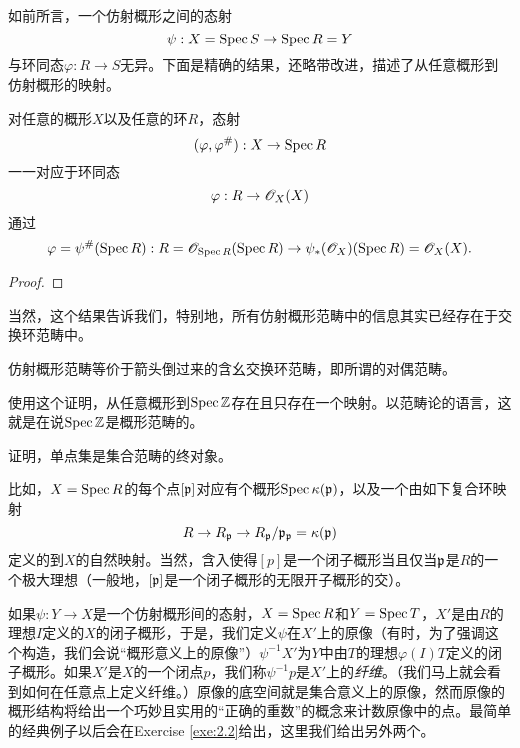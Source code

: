 如前所言，一个仿射概形之间的态射
\[
	\psi:X=\operatorname{Spec} S\to\operatorname{Spec} R=Y
\]
与环同态$\varphi:R\to S$无异。下面是精确的结果，还略带改进，描述了从任意概形到仿射概形的映射。

\begin{thm}
对任意的概形$X$以及任意的环$R$，态射
\[
	(\varphi,\varphi^\#):X\to \operatorname{Spec} R
\]
一一对应于环同态
\[
	\varphi:R\to \mathscr{O}_X(X)
\]
通过
\[
	\varphi=\psi^\#(\operatorname{Spec} R):R=\mathscr{O}_{\operatorname{Spec} R}(\operatorname{Spec} R)\to \psi_*(\mathscr{O}_X)(\operatorname{Spec} R)=\mathscr{O}_X(X).
\]
\end{thm}

\begin{proof}
\nottran
\end{proof}

当然，这个结果告诉我们，特别地，所有仿射概形范畴中的信息其实已经存在于交换环范畴中。

\begin{coro}\label{coro:1.41}
	仿射概形范畴等价于箭头倒过来的含幺交换环范畴，即所谓的对偶范畴。
\end{coro}

\begin{exe}\label{exe:1.42}
	\begin{compactenum}[(a)]
	\item 使用这个证明，从任意概形到$\operatorname{Spec} \mathbb{Z}$存在且只存在一个映射。以范畴论的语言，这就是在说$\operatorname{Spec} \mathbb{Z}$是概形范畴的。
	\item 证明，单点集是集合范畴的终对象。
	\end{compactenum}
\end{exe}

比如，$X=\operatorname{Spec} R$的每个点$[\mathfrak{p}]$对应有个概形$\operatorname{Spec} \kappa(\mathfrak{p})$，以及一个由如下复合环映射
\[
	R\to R_{\mathfrak{p}}\to R_{\mathfrak{p}}/\mathfrak{p}_{\mathfrak{p}}=\kappa(\mathfrak{p})
\]
定义的到$X$的自然映射。当然，含入使得$[p]$是一个闭子概形当且仅当$\mathfrak{p}$是$R$的一个极大理想（一般地，$[\mathfrak{p}]$是一个闭子概形的无限开子概形的交）。

如果$\psi:Y\to X$是一个仿射概形间的态射，$X=\operatorname{Spec} R$和$Y=\operatorname{Spec} T$，$X'$是由$R$的理想$I$定义的$X$的闭子概形，于是，我们定义$\psi$在$X'$上的原像（有时，为了强调这个构造，我们会说“概形意义上的原像”）$\psi^{-1}X'$为$Y$中由$T$的理想$\varphi(I)T$定义的闭子概形。如果$X'$是$X$的一个闭点$p$，我们称$\psi^{-1}p$是$X'$上的\textit{纤维}。（我们马上就会看到如何在任意点上定义纤维。）原像的底空间就是集合意义上的原像，然而原像的概形结构将给出一个巧妙且实用的“正确的重数”的概念来计数原像中的点。最简单的经典例子以后会在Exercise \ref{exe:2.2}给出，这里我们给出另外两个。

